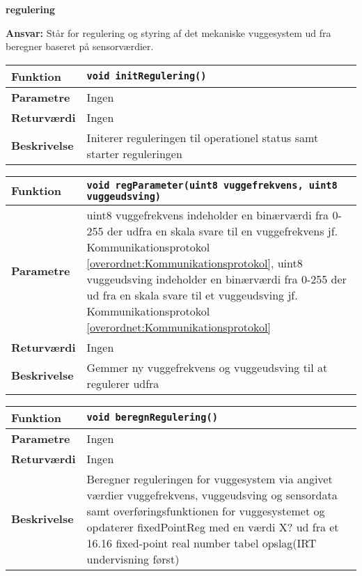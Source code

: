 {\centering
\textbf{regulering}\par
}
\textbf{Ansvar:} Står for regulering og styring af det mekaniske vuggesystem ud fra beregner baseret på sensorværdier. \

\begin{center}
    \begin{tabular}{ | l | p{} |}
    \hline
    \textbf{Funktion}	& \verb+void initRegulering() +								\\ \hline
    \textbf{Parametre} 	& Ingen														\\ \hline
    \textbf{Returværdi}	& Ingen														\\ \hline
    \textbf{Beskrivelse}	& Initerer reguleringen til operationel status samt starter reguleringen	\\ \hline
    \end{tabular}
\end{center}

\begin{center}
    \begin{tabular}{ | l | p{} |}
    \hline
    \textbf{Funktion}	& \verb+void regParameter(uint8 vuggefrekvens, uint8 vuggeudsving) +								\\ \hline
    \textbf{Parametre} 	& uint8 vuggefrekvens indeholder en binærværdi fra 0-255 der udfra en skala svare til en vuggefrekvens jf. Kommunikationsprotokol \ref{overordnet:Kommunikationsprotokol}, uint8 vuggeudsving indeholder en binærværdi fra 0-255 der ud fra en skala svare til et vuggeudsving jf. Kommunikationsprotokol \ref{overordnet:Kommunikationsprotokol}						\\ \hline
    \textbf{Returværdi}	& Ingen														\\ \hline
    \textbf{Beskrivelse}	& Gemmer ny vuggefrekvens og vuggeudsving til at regulerer udfra	\\ \hline
    \end{tabular}
\end{center}


\begin{center}
    \begin{tabular}{ | l | p{} |}
    \hline
    \textbf{Funktion}	& \verb+void beregnRegulering() +								\\ \hline
    \textbf{Parametre} 	& Ingen						\\ \hline
    \textbf{Returværdi}	& Ingen														\\ \hline
    \textbf{Beskrivelse}	& Beregner reguleringen for vuggesystem via angivet værdier vuggefrekvens, vuggeudsving og sensordata samt overføringsfunktionen for vuggesystemet og opdaterer fixedPointReg med en værdi X? ud fra et 16.16 fixed-point real number tabel opslag(IRT undervisning først)	\\ \hline
    \end{tabular}
\end{center}

